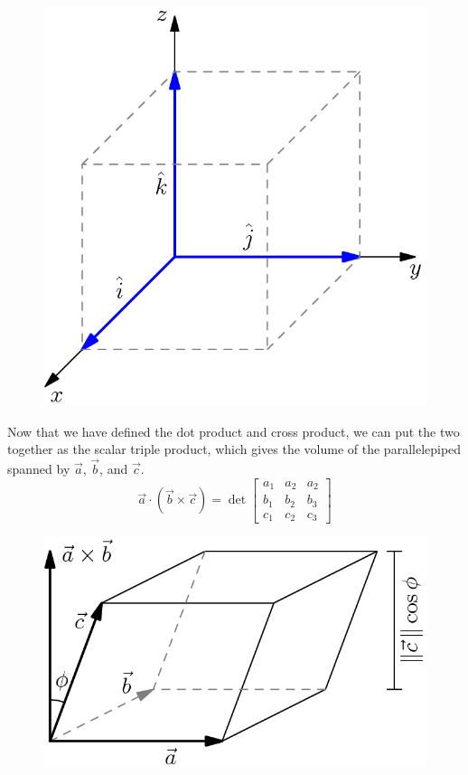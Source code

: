 \begin{figure}[h]
	\centering
	\includegraphics[scale=0.33]{Images/backgroundReview/UnitVectors}
\end{figure}




\noindent
Now that we have defined the dot product and cross product, we can put the two together as the scalar triple product, which gives the volume of the parallelepiped spanned by $\vec{a}$, $\vec{b}$, and $\vec{c}$.\\
\begin{equation*}
	\vec{a}\cdot\left(\vec{b}\times\vec{c}\right) = \det\begin{bmatrix}
		a_1 & a_2 & a_2 \\
		b_1 & b_2 & b_3 \\
		c_1 & c_2 & c_3
	\end{bmatrix}
\end{equation*}

\begin{figure}[h]
	\centering
	\includegraphics[scale=0.33]{Images/backgroundReview/Parallelipiped}
\end{figure}
